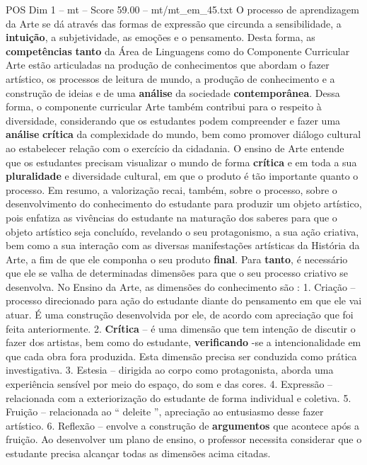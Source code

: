\begin{textsample}{POS Dim 1 – mt – Score 59.00 – mt/mt\_em\_45.txt}
O processo de aprendizagem da Arte se dá através das formas de expressão que circunda a sensibilidade, a \textbf{intuição}, a subjetividade, as emoções e o pensamento.
Desta forma, as \textbf{competências} \textbf{tanto} da Área de Linguagens como do Componente Curricular Arte estão articuladas na produção de conhecimentos que abordam o fazer artístico, os processos de leitura de mundo, a produção de conhecimento e a construção de ideias e de uma \textbf{análise} da sociedade \textbf{contemporânea}.
Dessa forma, o componente curricular Arte também contribui para o respeito à diversidade, considerando que os estudantes podem compreender e fazer uma \textbf{análise} \textbf{crítica} da complexidade do mundo, bem como promover diálogo cultural ao estabelecer relação com o exercício da cidadania.
O ensino de Arte entende que os estudantes precisam visualizar o mundo de forma \textbf{crítica} e em toda a sua \textbf{pluralidade} e diversidade cultural, em que o produto é tão importante quanto o processo.
Em resumo, a valorização recai, também, sobre o processo, sobre o desenvolvimento do conhecimento do estudante para produzir um objeto artístico, pois enfatiza as vivências do estudante na maturação dos saberes para que o objeto artístico seja concluído, revelando o seu protagonismo, a sua ação criativa, bem como a sua interação com as diversas manifestações artísticas da História da Arte, a fim de que ele componha o seu produto \textbf{final}.
Para \textbf{tanto}, é necessário que ele se valha de determinadas dimensões para que o seu processo criativo se desenvolva.
No Ensino da Arte, as dimensões do conhecimento são : 1.
Criação – processo direcionado para ação do estudante diante do pensamento em que ele vai atuar.
É uma construção desenvolvida por ele, de acordo com apreciação que foi feita anteriormente. 2. \textbf{Crítica} – é uma dimensão que tem intenção de discutir o fazer dos artistas, bem como do estudante, \textbf{verificando} -se a intencionalidade em que cada obra fora produzida.
Esta dimensão precisa ser conduzida como prática investigativa. 3.
Estesia – dirigida ao corpo como protagonista, aborda uma experiência sensível por meio do espaço, do som e das cores. 4.
Expressão – relacionada com a exteriorização do estudante de forma individual e coletiva. 5.
Fruição – relacionada ao “ deleite ”, apreciação ao entusiasmo desse fazer artístico. 6.
Reflexão – envolve a construção de \textbf{argumentos} que acontece após a fruição.
Ao desenvolver um plano de ensino, o professor necessita considerar que o estudante precisa alcançar todas as dimensões acima citadas.

\end{textsample}

